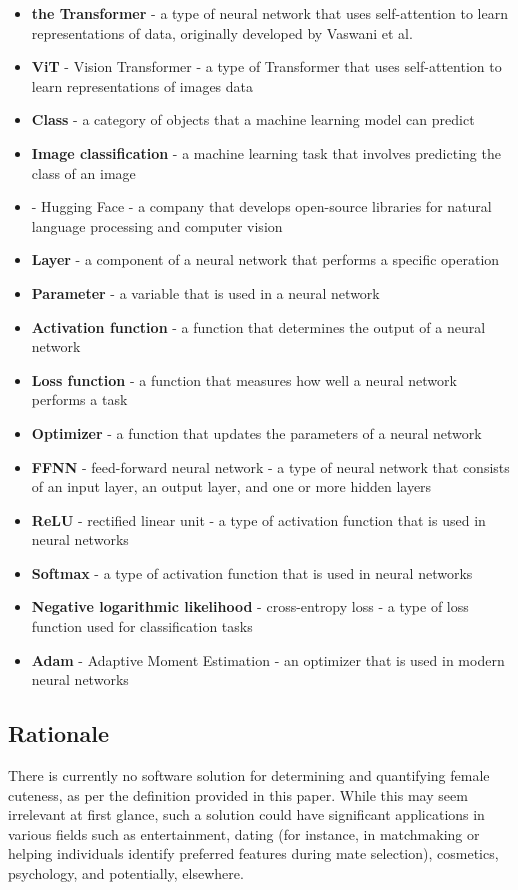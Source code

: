 \documentclass{article}
\begin{document}
\begin{itemize}
    \item \textbf{the Transformer} - a type of neural network that uses self-attention to learn representations of data, originally developed by Vaswani et al.\cite{vaswani2017attention}
    \item \textbf{ViT} - Vision Transformer - a type of Transformer that uses self-attention to learn representations of images data\cite{wu2020visual}
    \item \textbf{Class} - a category of objects that a machine learning model can predict
    \item \textbf{Image classification} - a machine learning task that involves predicting the class of an image
    \item {} - Hugging Face - a company that develops open-source libraries for natural language processing and computer vision
    \item \textbf{Layer} - a component of a neural network that performs a specific operation
    \item \textbf{Parameter} - a variable that is used in a neural network
    \item \textbf{Activation function} - a function that determines the output of a neural network
    \item \textbf{Loss function} - a function that measures how well a neural network performs a task
    \item \textbf{Optimizer} - a function that updates the parameters of a neural network
    \item \textbf{FFNN} - feed-forward neural network - a type of neural network that consists of an input layer, an output layer, and one or more hidden layers
    \item \textbf{ReLU} - rectified linear unit - a type of activation function that is used in neural networks
    \item \textbf{Softmax} - a type of activation function that is used in neural networks
    \item \textbf{Negative logarithmic likelihood} - cross-entropy loss - a type of loss function used for classification tasks
    \item \textbf{Adam} - Adaptive Moment Estimation - an optimizer that is used in modern neural networks
\end{itemize}

\subsection{Rationale}
There is currently no software solution for determining and quantifying female cuteness, as per the definition provided in this paper. While this may seem irrelevant at first glance, such a solution could have significant applications in various fields such as entertainment, dating (for instance, in matchmaking or helping individuals identify preferred features during mate selection), cosmetics, psychology, and potentially, elsewhere.
\end{document}
